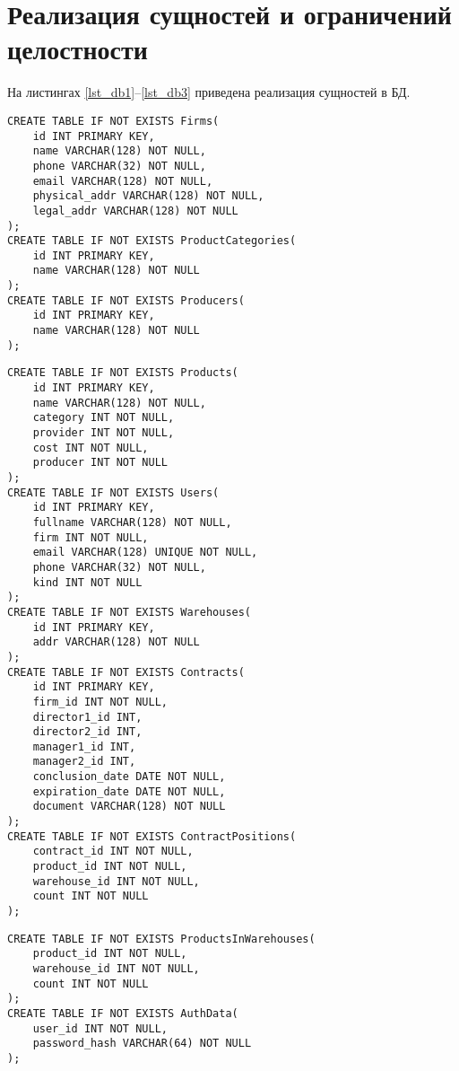 \section{Реализация сущностей и ограничений целостности}
На листингах \ref{lst_db1}--\ref{lst_db3} приведена реализация сущностей в БД.
\begin{lstlisting}[label=lst_db1,caption=\raggedright{Реализация сущностей в БД}]
CREATE TABLE IF NOT EXISTS Firms(
	id INT PRIMARY KEY,
	name VARCHAR(128) NOT NULL,
	phone VARCHAR(32) NOT NULL,
	email VARCHAR(128) NOT NULL,
	physical_addr VARCHAR(128) NOT NULL,
	legal_addr VARCHAR(128) NOT NULL
);
CREATE TABLE IF NOT EXISTS ProductCategories(
	id INT PRIMARY KEY,
	name VARCHAR(128) NOT NULL
);
CREATE TABLE IF NOT EXISTS Producers(
	id INT PRIMARY KEY,
	name VARCHAR(128) NOT NULL
);
\end{lstlisting}
\begin{lstlisting}[label=lst_db2,caption=\raggedright{Реализация сущностей в БД (продолжение)}]
CREATE TABLE IF NOT EXISTS Products(
	id INT PRIMARY KEY,
	name VARCHAR(128) NOT NULL,
	category INT NOT NULL,
	provider INT NOT NULL,
	cost INT NOT NULL,
	producer INT NOT NULL
);
CREATE TABLE IF NOT EXISTS Users(
	id INT PRIMARY KEY,
	fullname VARCHAR(128) NOT NULL,
	firm INT NOT NULL,
	email VARCHAR(128) UNIQUE NOT NULL,
	phone VARCHAR(32) NOT NULL,
	kind INT NOT NULL
);
CREATE TABLE IF NOT EXISTS Warehouses(
	id INT PRIMARY KEY,
	addr VARCHAR(128) NOT NULL
);
CREATE TABLE IF NOT EXISTS Contracts(
	id INT PRIMARY KEY,
	firm_id INT NOT NULL,
	director1_id INT,
	director2_id INT,
	manager1_id INT,
	manager2_id INT,
	conclusion_date DATE NOT NULL,
	expiration_date DATE NOT NULL,
	document VARCHAR(128) NOT NULL
);
CREATE TABLE IF NOT EXISTS ContractPositions(
	contract_id INT NOT NULL,
	product_id INT NOT NULL,
	warehouse_id INT NOT NULL,
	count INT NOT NULL
);
\end{lstlisting}
\newpage
\begin{lstlisting}[label=lst_db3,caption=\raggedright{Реализация сущностей в БД (окончание)}]
CREATE TABLE IF NOT EXISTS ProductsInWarehouses(
	product_id INT NOT NULL,
	warehouse_id INT NOT NULL,
	count INT NOT NULL
);
CREATE TABLE IF NOT EXISTS AuthData(
	user_id INT NOT NULL,
	password_hash VARCHAR(64) NOT NULL
);
\end{lstlisting}

